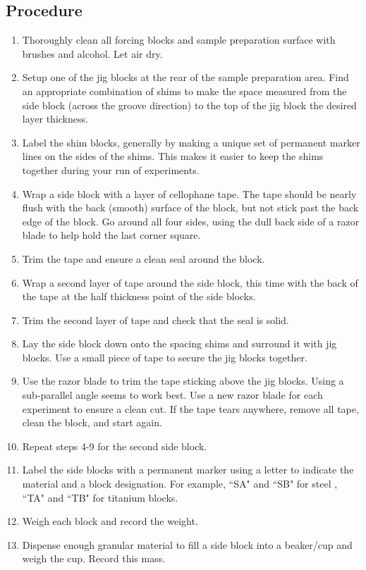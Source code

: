 \subsection{Procedure}
\begin{enumerate}
\item Thoroughly clean all forcing blocks and sample preparation surface with brushes and alcohol. Let air dry.
\item Setup one of the jig blocks at the rear of the sample preparation area. Find an appropriate combination of shims to make the space measured from the side block (across the groove direction) to the top of the jig block the desired layer thickness.
\item Label the shim blocks, generally by making a unique set of permanent marker lines on the sides of the shims. This makes it easier to keep the shims together during your run of experiments.
\item Wrap a side block with a layer of cellophane tape. The tape should be nearly flush with the back (smooth) surface of the block, but not stick past the back edge of the block. Go around all four sides, using the dull back side of a razor blade to help hold the last corner square.
\item Trim the tape and ensure a clean seal around the block.
\item Wrap a second layer of tape around the side block, this time with the back of the tape at the half thickness point of the side blocks.
\item Trim the second layer of tape and check that the seal is solid.
\item Lay the side block down onto the spacing shims and surround it with jig blocks. Use a small piece of tape to secure the jig blocks together.
\item Use the razor blade to trim the tape sticking above the jig blocks. Using a sub-parallel angle seems to work best. Use a new razor blade for each experiment to ensure a clean cut. If the tape tears anywhere, remove all tape, clean the block, and start again.
\item Repeat steps 4-9 for the second side block.
\item Label the side blocks with a permanent marker using a letter to indicate the material and a block designation. For example, ``SA" and ``SB" for steel , ``TA" and ``TB" for titanium blocks.
\item Weigh each block and record the weight.
\item Dispense enough granular material to fill a side block into a beaker/cup and weigh the cup. Record this mass.

\end{enumerate}
